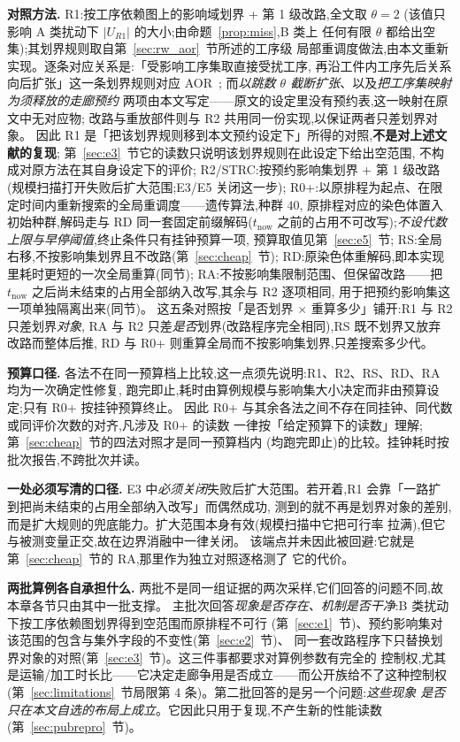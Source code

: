 \documentclass[manuscript,screen,review]{acmart}
\providecommand{\STRC}{\textsc{STRC}}
\begin{document}
\textbf{对照方法.}
R1:按工序依赖图上的影响域划界 + 第 1 级改路,全文取 \(\theta=2\)
(该值只影响 A 类扰动下 \(|U_{R1}|\) 的大小;由命题~\ref{prop:miss},B 类上
任何有限 \(\theta\) 都给出空集);其划界规则取自第~\ref{sec:rw_aor}~节所述的工序级
局部重调度做法,由本文重新实现。逐条对应关系是:「受影响工序集取直接受扰工序,
再沿工件内工序先后关系向后扩张」这一条划界规则对应
AOR~\cite{abumaizar1997rescheduling,subramaniam2003maor};
而\emph{以跳数 \(\theta\) 截断扩张}、以及\emph{把工序集映射为须释放的走廊预约}
两项由本文写定——原文的设定里没有预约表,这一映射在原文中无对应物;
改路与重放部件则与 R2 共用同一份实现,以保证两者只差划界对象。
因此 R1 是「把该划界规则移到本文预约设定下」所得的对照,\textbf{不是对上述文献的复现};
第~\ref{sec:e3}~节它的读数只说明该划界规则在此设定下给出空范围,
不构成对原方法在其自身设定下的评价;
R2/\STRC:按预约影响集划界 + 第 1 级改路(规模扫描打开失败后扩大范围;E3/E5 关闭这一步);
R0+:以原排程为起点、在限定时间内重新搜索的全局重调度——遗传算法,种群 \(40\),
原排程对应的染色体置入初始种群,解码走与 RD 同一套固定前缀解码(\(t_{\mathrm{now}}\)
之前的占用不可改写);\emph{不设代数上限与早停阈值},终止条件只有挂钟预算一项,
预算取值见第~\ref{sec:e5}~节;
RS:全局右移,不按影响集划界且不改路(第~\ref{sec:cheap}~节);
RD:原染色体重解码,即本实现里耗时更短的一次全局重算(同节);
RA:不按影响集限制范围、但保留改路——把 \(t_{\mathrm{now}}\) 之后尚未结束的占用全部纳入改写,其余与 R2 逐项相同,
用于把预约影响集这一项单独隔离出来(同节)。
这五条对照按「是否划界 \(\times\) 重算多少」铺开:R1 与 R2 只差划界\emph{对象},
RA 与 R2 只差\emph{是否}划界(改路程序完全相同),RS 既不划界又放弃改路而整体后推,
RD 与 R0+ 则重算全局而不按影响集划界,只差搜索多少代。

\textbf{预算口径.}
各法不在同一预算档上比较,这一点须先说明:R1、R2、RS、RD、RA 均为一次确定性修复,
跑完即止,耗时由算例规模与影响集大小决定而非由预算设定;只有 R0+ 按挂钟预算终止。
因此 R0+ 与其余各法之间不存在同挂钟、同代数或同评价次数的对齐,凡涉及 R0+ 的读数
一律按「给定预算下的读数」理解;第~\ref{sec:cheap}~节的四法对照才是同一预算档内
(均跑完即止)的比较。挂钟耗时按批次报告,不跨批次并读。

\textbf{一处必须写清的口径.}
E3 中\emph{必须关闭}失败后扩大范围。若开着,R1 会靠「一路扩到把尚未结束的占用全部纳入改写」而偶然成功,
测到的就不再是划界对象的差别,而是扩大规则的兜底能力。扩大范围本身有效(规模扫描中它把可行率
拉满),但它与被测变量正交,故在边界消融中一律关闭。
该端点并未因此被回避:它就是第~\ref{sec:cheap}~节的 RA,那里作为独立对照逐格测了
它的代价。

\textbf{两批算例各自承担什么.}
两批不是同一组证据的两次采样,它们回答的问题不同,故本章各节只由其中一批支撑。
主批次回答\emph{现象是否存在、机制是否干净}:B 类扰动下按工序依赖图划界得到空范围而原排程不可行
(第~\ref{sec:e1}~节)、预约影响集对该范围的包含与集外字段的不变性(第~\ref{sec:e2}~节)、
同一套改路程序下只替换划界对象的对照(第~\ref{sec:e3}~节)。这三件事都要求对算例参数有完全的
控制权,尤其是运输/加工时长比——它决定走廊争用是否成立——而公开族给不了这种控制权
(第~\ref{sec:limitations}~节局限第 4 条)。第二批回答的是另一个问题:\emph{这些现象
是否只在本文自选的布局上成立}。它因此只用于复现,不产生新的性能读数
(第~\ref{sec:pubrepro}~节)。
\end{document}
